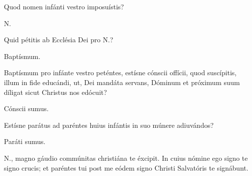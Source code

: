
Quod nomen infánti vestro imposuístis?

 {\color{red}N.}

 Quid pétitis ab Ecclésia Dei pro {\color{red}N.}?

 Baptísmum.

 Baptísmum pro infánte vestro peténtes,
estísne cónscii offícii, quod suscípitis, illum in fide educándi, ut, Dei
mandáta servans, Dóminum et próximum suum díligat sicut Christus nos
edócuit?

 Cónscii sumus.

 Estísne parátus ad paréntes huius infántis in suo múnere
adiuvándos?

 Paráti sumus.

 {\color{red}N.}, magno gáudio commúnitas
christiána te éxcipit. In cuius nómine ego signo te signo crucis; et paréntes
tui post me eódem signo Christi Salvatóris te signábunt.


